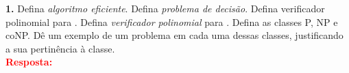 
\noindent\textbf{1.} Defina \textit{algoritmo eficiente}. Defina \textit{problema de decisão}. Defina {verificador polinomial} para . Defina \textit{verificador polinomial} para . Defina as classes P, NP e coNP. Dê um exemplo de um problema em cada uma dessas classes, justificando a sua pertinência à classe.\\[6pt]
\textcolor{red}{\textbf{Resposta:}}
